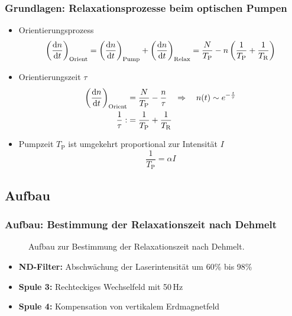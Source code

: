 \begin{frame}
\frametitle{Grundlagen: Relaxationsprozesse beim optischen Pumpen}
\begin{itemize}[<+->]
    \item Orientierungsprozess
    \begin{equation*}
        \left(\frac{\mathrm{d} n}{\mathrm{d} t}\right)_{\text{Orient}}
        =\left(\frac{\mathrm{d} n}{\mathrm{d} t}\right)_{\text{Pump}} + \left(\frac{\mathrm{d} n}{\mathrm{d} t}\right)_{\text{Relax}}
        =\frac{N}{T_\text{P}}-n \left( \frac{1}{T_\text{P}} + \frac{1}{T_\text{R}}\right)
    \end{equation*}
    \item Orientierungszeit $\tau$
    \begin{equation*}
        \begin{split}
            \left(\frac{\mathrm{d} n}{\mathrm{d} t}\right)_{\text{Orient}} &= \frac{N}{T_\text{P}}- \frac{n}{\tau} \quad \Rightarrow \quad n(t) \sim e^{-\frac{t}{\tau}} \\
            \frac{1}{\tau} :&= \frac{1}{T_\text{P}} + \frac{1}{T_\text{R}}
        \end{split}
    \end{equation*}
    \item Pumpzeit $T_\text{P}$ ist umgekehrt proportional zur Intensität $I$
    \begin{equation*}
        \frac{1}{T_\text{P}} = \alpha I
    \end{equation*}
\end{itemize}
\end{frame}



\subsection{Aufbau}
\begin{frame}
\frametitle{Aufbau: Bestimmung der Relaxationszeit nach Dehmelt}

\begin{figure}
    \centering
    \def\svgwidth{\textwidth}
    
    \caption{Aufbau zur Bestimmung der Relaxationszeit nach Dehmelt.}
\end{figure}

\begin{itemize}
    \item \textbf{ND-Filter:} Abschwächung der Laserintensität um 60\% bis 98\%
    \item \textbf{Spule 3:} Rechteckiges Wechselfeld mit 50\,Hz
    \item \textbf{Spule 4:} Kompensation von vertikalem Erdmagnetfeld
\end{itemize}
\end{frame}

